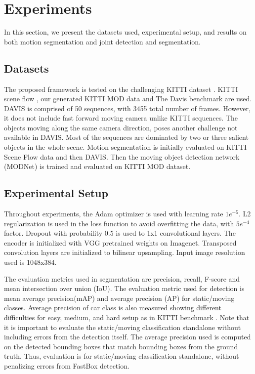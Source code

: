 \documentclass[letterpaper, 10 pt, conference]{ieeeconf}  %
\begin{document}
\section{Experiments}
\label{sec:exps}
In this section, we present the datasets used, experimental setup, and results on both motion segmentation and joint detection and segmentation. 

\subsection{Datasets}
The proposed framework is tested on the challenging KITTI dataset \cite{Geiger2013IJRR}. KITTI scene flow \cite{menze2015object}, our generated KITTI MOD data and The Davis \cite{perazzi2016} benchmark are used. DAVIS is comprised of 50 sequences, with 3455 total number of frames. However, it does not include fast forward moving camera unlike KITTI sequences. The objects moving along the same camera direction, poses another challenge not available in DAVIS. Most of the sequences are dominated by two or three salient objects in the whole scene. Motion segmentation is initially evaluated on KITTI Scene Flow data and then DAVIS. Then the moving object detection network (MODNet) is trained and evaluated on KITTI MOD dataset.

\subsection{Experimental Setup}
Throughout experiments, the Adam optimizer is used with learning rate $1e^{-5}$. L2 regularization is used in the loss function to avoid overfitting the data, with $5e^{-4}$ factor. Dropout with probability 0.5 is used to 1x1 convolutional layers. The encoder is initialized with VGG pretrained weights on Imagenet. Transposed convolution layers are initialized to bilinear upsampling. Input image resolution used is 1048x384. 

The evaluation metrics used in segmentation are precision, recall, F-score and mean intersection over union (IoU). The evaluation metric used for detection is mean average precision(mAP) and average precision (AP) for static/moving classes. Average precision of car class is also measured showing different difficulties for easy, medium, and hard setup as in KITTI benchmark \cite{Geiger2012CVPR}. Note that it is important to evaluate the static/moving classification standalone without including errors from the detection itself. The average precision used is computed on the detected bounding boxes that match bounding boxes from the ground truth. Thus, evaluation is for static/moving classification standalone, without penalizing errors from FastBox detection.
\end{document}
